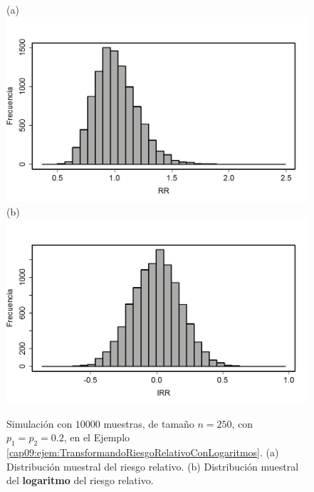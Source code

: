 \begin{ejemplo}
\begin{figure}[p]
\begin{center}
\begin{enColor}
\end{enColor}
\begin{bn}
(a)\\[3mm]
\includegraphics[width=13cm]{../fig/Cap09-EjemploLogRR03-bn.png}\\[3mm]
(b)\\[3mm]
\includegraphics[width=13cm]{../fig/Cap09-EjemploLogRR04-bn.png}
\end{bn}
\caption{Simulación con $10000$ muestras, de tamaño $n=250$, con $p_1=p_2=0.2$, en el Ejemplo \ref{cap09:ejem:TransformandoRiesgoRelativoConLogaritmos}. (a) Distribución muestral  del riesgo relativo. (b) Distribución muestral del {\bf logaritmo} del riesgo relativo.}
\label{cap06:fig:EjemploLogRR02}
\end{center}
\end{figure}


\end{ejemplo}
